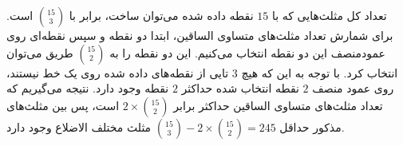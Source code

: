 \p
تعداد کل مثلث‌هایی که با
$15$
 نقطه داده شده می‌توان ساخت، برابر با 
 \(\binom{15}{3}\)
  است. برای شمارش تعداد مثلث‌های متساوی الساقین، ابتدا دو نقطه و سپس نقطه‌ای روی عمودمنصف این دو نقطه انتخاب می‌کنیم. 
   این دو نقطه را به 
  \(\binom{15}{2}\)
   طریق می‌توان انتخاب کرد. با توجه به این که هیچ
$3$ 
   تایی از نقطه‌های داده شده روی یک خط نیستند، روی عمود منصف 
$2$ 
   نقطه انتخاب شده حداکثر 
$2$ 
   نقطه وجود دارد. نتیجه می‌گیریم که تعداد مثلث‌های متساوی الساقین حداکثر برابر 
   \(2\times\binom{15}{2}\)
    است، پس بین مثلث‌های مذکور حداقل
    \(\binom{15}{3} - 2\times\binom{15}{2} = 245\)
     مثلث مختلف الاضلاع وجود دارد.
